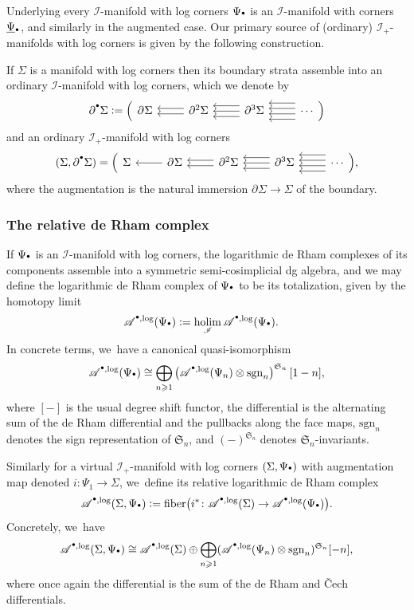\documentclass[JEP,XML,SOM,Unicode,NoFloatCountersInSection,published]{cedram}
\let\oldbullet\bullet
\renewcommand{\bullet}{{\raisebox{1pt}{$\scriptscriptstyle\oldbullet$}}}
\newcommand{\rbirac}[1]{\bigl(#1\bigr)}
\newcommand{\rBrac}[1]{\Bigl(#1\Bigr)}
\theoremstyle{definition}
\theoremstyle{remark}
\newenvironment{example}
  {\pushQED{\qed}\renewcommand{\qedsymbol}{$\lozenge$}\examplex}
  {\popQED\endexamplex}
\renewcommand{\ge}{\geqslant}
\newcommand{\defas}{\mathrel{\mathop:}=}
\newcommand{\rbrac}[1]{\left(#1\right)}
\newcommand{\Alog}[2][\bullet]{\mathscr{A}^{#1,\log}(#2)}
\newcommand{\Sig}{\Sigma}
\newcommand{\bdSig}[1][]{\partial^{#1}\Sigma}
\newcommand{\symgp}[1]{\mathfrak{S}_{#1}}
\newcommand{\sgn}[1]{\mathrm{sgn}_{#1}}
\newcommand{\simp}[3]
{
\begin{tikzcd}[ampersand replacement=\&]
     {#1} \& {#2} \ar[l,shift left = 1]\ar[l,shift right=1] \& {#3} \ar[l,shift left = 2]\ar[l,shift left = 0]\ar[l,shift left = -2] \& \ar[l,shift left = 3]\ar[l,shift left = 1]\ar[l,shift left = -1]\ar[l,shift left = -3] \cdots
    \end{tikzcd}
}
\newcommand{\augsimp}[4]
{
\begin{tikzcd}[ampersand replacement=\&]
     #1 \& #2 \ar[l] \& #3
     \ar[l,shift left = 1]\ar[l,shift right=1] \& #4 \ar[l,shift left = 2]\ar[l,shift left = 0]\ar[l,shift left = -2] \& \ar[l,shift left = 3]\ar[l,shift left = 1]\ar[l,shift left = -1]\ar[l,shift left = -3] \cdots
    \end{tikzcd}
}
\newcommand{\scat}{\mathscr{I}}
\newcommand{\ascat}{\mathscr{I}_+}
\DeclareMathOperator*{\holim}{holim}
\DeclareMathOperator*{\fibre}{fiber}
\begin{document}
Underlying every $\scat$-manifold with log corners $\Psi_\bullet$ is an $\scat$-manifold with corners $\underline{\Psi}_\bullet$, and similarly in the augmented case. Our primary source of (ordinary) $\ascat$-manifolds with log corners is given by the following construction.

\begin{example}
If $\Sig$ is a manifold with log corners then its boundary strata assemble into an ordinary $\scat$-manifold with log corners, which we denote by\vspace*{-3pt}
\[
\bdSig[\bullet] \defas \rBrac{\simp{\bdSig}{\bdSig[2]}{\bdSig[3]}}
\]
and an ordinary $\ascat$-manifold with log corners\vspace*{-3pt}
\[
(\Sig,\bdSig[\bullet]) = \rBrac{\augsimp{\Sig}{\bdSig}{\bdSig[2]}{\bdSig[3]}},
\]
where the augmentation is the natural immersion $\bdSig \to \Sig$ of the boundary.
\end{example}

\subsubsection{The relative de Rham complex}\label{sec:relative-de-Rham}
If $\Psi_\bullet$ is an $\scat$-manifold with log corners, the logarithmic de Rham complexes of its components assemble into a symmetric semi-cosimplicial dg algebra, and we may define the logarithmic de Rham complex of $\Psi_\bullet$ to be its totalization, given by the homotopy limit
\begin{align*}
\Alog{\Psi_\bullet} &\defas \holim_{\scat} \Alog{\Psi_\bullet}.
\end{align*}
In concrete terms, we~have a canonical quasi-isomorphism
\[
\Alog{\Psi_\bullet} \cong \bigoplus_{n \ge 1} \rbrac{\Alog{\Psi_n} \otimes \sgn{n}}^{\symgp{n}}[1-n],
\]
where $[-]$ is the usual degree shift functor, the differential is the alternating sum of the de Rham differential and the pullbacks along the face maps, $\sgn{n}$ denotes the sign representation of $\symgp{n}$, and $(-)^{\symgp{n}}$ denotes $\symgp{n}$-invariants.

Similarly for a virtual $\ascat$-manifold with log corners $(\Sig,\Psi_\bullet)$ with augmentation map denoted $i \colon \Psi_1 \to \Sig$, we~define its relative logarithmic de Rham complex
\[
\Alog{\Sig,\Psi_\bullet} \defas \fibre\rbirac{i^*\colon \Alog{\Sig} \to \Alog{\Psi_\bullet}}.
\]
Concretely, we~have
\[
\Alog{\Sig,\Psi_\bullet} \cong \Alog{\Sig} \oplus \bigoplus_{n \ge 1}(\Alog{\Psi_n} \otimes \sgn{n})^{\symgp{n}}[-n],
\]
where once again the differential is the sum of the de Rham and \v{C}ech differentials.
\end{document}
